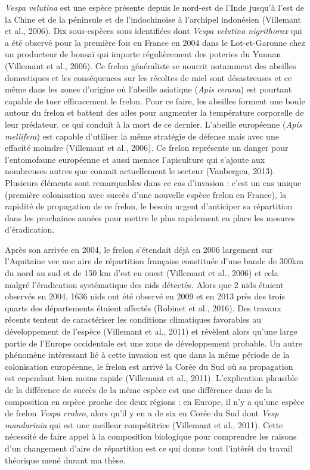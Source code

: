 \emph{Vespa velutina} est une espèce présente depuis le nord-est de
l'Inde jusqu'à l'est de la Chine et de la péninsule et de l'indochinoise
à l'archipel indonésien (Villemant et al., 2006). Dix sous-espèces sous
identifiées dont \emph{Vespa velutina nigrithorax} qui a été observé
pour la première fois en France en 2004 dans le Lot-et-Garonne chez un
producteur de bonsaï qui importe régulièrement des poteries du Yunnan
(Villemant et al., 2006). Ce frelon généraliste se nourrit notamment des
abeilles domestiques et les conséquences sur les récoltes de miel sont
désastreuses et ce même dans les zones d'origine où l'abeille asiatique
(\emph{Apis cerana}) est pourtant capable de tuer efficacement le
frelon. Pour ce faire, les abeilles forment une boule autour du frelon
et battent des ailes pour augmenter la température corporelle de leur
prédateur, ce qui conduit à la mort de ce dernier. L'abeille européenne
(\emph{Apis mellifera}) est capable d'utiliser la même stratégie de
défense mais avec une effacité moindre (Villemant et al., 2006). Ce
frelon représente un danger pour l'entomofaune européenne et aussi
menace l'apiculture qui s'ajoute aux nombreuses autres que connait
actuellement le secteur (Vanbergen, 2013). Plusieurs éléments sont
remarquables dans ce cas d'invasion : c'est un cas unique (première
colonisation avec succès d'une nouvelle espèce frelon en France), la
rapidité de propagation de ce frelon, le besoin urgent d'anticiper sa
répartition dans les prochaines années pour mettre le plus rapidement en
place les mesures d'éradication.

Après son arrivée en 2004, le frelon s'étendait déjà en 2006 largement
sur l'Aquitaine vec une aire de répartition française constituée d'une
bande de 300km du nord au sud et de 150 km d'est en ouest (Villemant et
al., 2006) et cela malgré l'éradication systématique des nids détectés.
Alors que 2 nids étaient observés en 2004, 1636 nids ont été observé en
2009 et en 2013 près des trois quarts des départements étaient affectés
(Robinet et al., 2016). Des travaux récents tentent de caractériser les
conditions climatiques favorables au développement de l'espèce
(Villemant et al., 2011) et révèlent alors qu'une large partie de
l'Europe occidentale est une zone de développement probable. Un autre
phénomène intéressant lié à cette invasion est que dans la même période
de la colonisation européenne, le frelon est arrivé la Corée du Sud où
sa propagation est cependant bien moins rapide (Villemant et al., 2011).
L'explication plausible de la différence de succès de la même espèce est
une différence dans de la composition en espèce proche des deux régions
: en Europe, il n'y a qu'une espèce de frelon \emph{Vespa crabro}, alors
qu'il y en a de six en Corée du Sud dont \emph{Vesp mandarinia} qui est
une meilleur compétitrice (Villemant et al., 2011). Cette nécessité de
faire appel à la composition biologique pour comprendre les raisons d'un
changement d'aire de répartition est ce qui donne tout l'intérêt du
travail théorique mené durant ma thèse.

